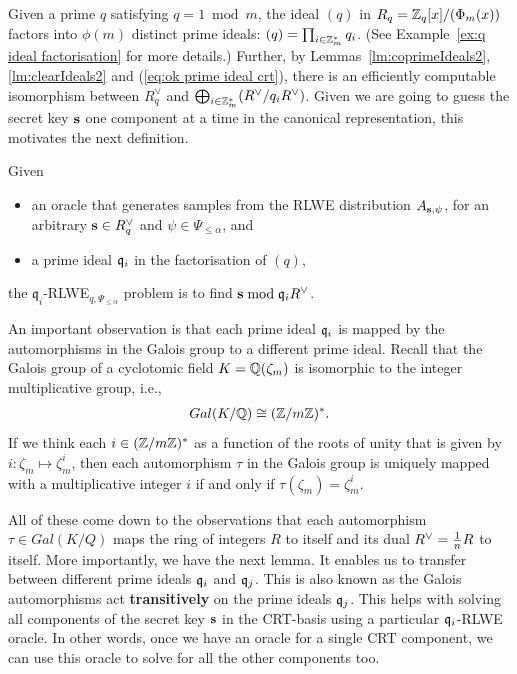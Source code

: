 \documentclass[../main.tex]{subfiles}
\begin{document}

Given a prime $q$ satisfying $q = 1 \bmod m$, 
the ideal $(q)$ in $R_q = \mathbb{Z}_q[x]/(\Phi_m(x))$ factors into $\phi(m)$ distinct prime ideals: $(q) = \prod_{i\in\mathbb{Z}_m^*} q_i$. (See Example~\ref{ex:q ideal factorisation} for more details.)
Further, by Lemmas~\ref{lm:coprimeIdeals2}, \ref{lm:clearIdeals2} and (\ref{eq:ok prime ideal crt}), there is an efficiently computable isomorphism between $R_q^{\vee}$ and $\bigoplus_{i \in \mathbb{Z}_m^*} (R^{\vee}/q_iR^{\vee})$.
Given we are going to guess the secret key $\mathbf{s}$ one component at a time in the canonical representation, this motivates the next definition.

\begin{definition}
\reversemarginpar
{}
Given 
\begin{itemize}\itemsep1mm\parskip0mm
\item an oracle that generates samples from the RLWE distribution $A_{\mathbf{s},\psi}$, for an arbitrary $\mathbf{s} \in R^{\vee}_q$ and $\psi \in \Psi_{\le \alpha}$, and
\item a prime ideal $\mathfrak{q}_i$ in the factorisation of $(q)$, 
\end{itemize}
the $\mathfrak{q}_i$-RLWE$_{q,\Psi_{\le \alpha}}$ problem is to find $\mathbf{s} \bmod \mathfrak{q}_i R^{\vee}$.
\end{definition}


An important observation is that each prime ideal $\mathfrak{q}_i$ is mapped by the automorphisms in the Galois group to a different prime ideal. Recall that the Galois group of a cyclotomic field $K=\mathbb{Q}(\zeta_m)$ is isomorphic to the integer multiplicative group, i.e.,
\begin{align*}
    Gal(K/\mathbb{Q}) \cong (\mathbb{Z}/m\mathbb{Z})^*.
\end{align*}
If we think each $i \in (\mathbb{Z}/m\mathbb{Z})^*$ as a function of the roots of unity that is given by $i: \zeta_m \mapsto \zeta_m^i$, then each automorphism $\tau$ in the Galois group is uniquely mapped with a multiplicative integer $i$ if and only if $\tau(\zeta_m)=\zeta_m^i$. 

All of these come down to the observations that each automorphism $\tau \in Gal(K/Q)$ maps the ring of integers $R$ to itself and its dual $R^{\vee}=\frac{1}{n}R$ to itself. More importantly, we have the next lemma. It enables us to transfer between different prime ideals $\mathfrak{q}_i$ and $\mathfrak{q}_j$. This is also known as the Galois automorphisms act \textbf{transitively} on the prime ideals $\mathfrak{q}_j$. This helps with solving all components of the secret key $\mathbf{s}$ in the CRT-basis using a particular $\mathfrak{q}_i$-RLWE oracle. In other words, once we have an oracle for a single CRT component, we can use this oracle to solve for all the other components too. 
\end{document}
